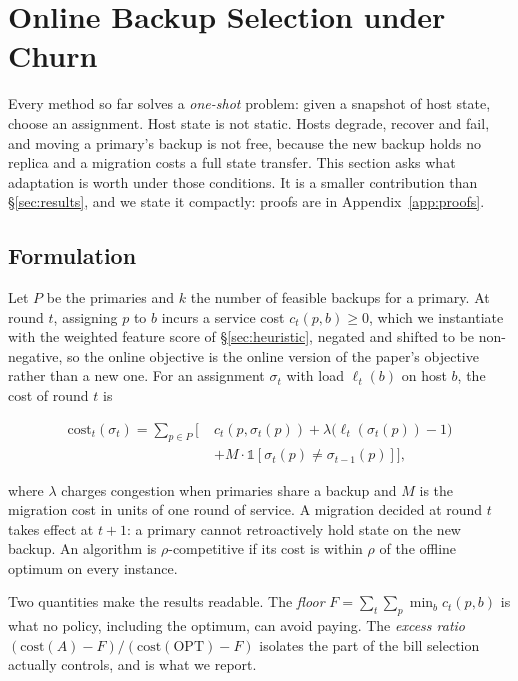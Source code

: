 \section{Online Backup Selection under Churn}
\label{sec:online}

Every method so far solves a \emph{one-shot} problem: given a snapshot of host
state, choose an assignment. Host state is not static. Hosts degrade, recover
and fail, and moving a primary's backup is not free, because the new backup
holds no replica and a migration costs a full state transfer. This section asks
what adaptation is worth under those conditions. It is a smaller contribution
than \S\ref{sec:results}, and we state it compactly: proofs are in
Appendix~\ref{app:proofs}.

\subsection{Formulation}
\label{sec:online:model}

Let $P$ be the primaries and $k$ the number of feasible backups for a primary.
At round $t$, assigning $p$ to $b$ incurs a service cost $c_t(p,b) \ge 0$, which
we instantiate with the weighted feature score of \S\ref{sec:heuristic}, negated
and shifted to be non-negative, so the online objective is the online version of
the paper's objective rather than a new one. For an assignment $\sigma_t$ with
load $\ell_t(b)$ on host $b$, the cost of round $t$ is

\begin{equation}
\begin{split}
\mathrm{cost}_t(\sigma_t) = \sum_{p \in P} \Big[\;
  & c_t(p, \sigma_t(p))
  + \lambda\big(\ell_t(\sigma_t(p)) - 1\big) \\
  & + M \cdot \mathbb{1}[\sigma_t(p) \neq \sigma_{t-1}(p)] \Big],
\end{split}
\label{eq:roundcost}
\end{equation}

where $\lambda$ charges congestion when primaries share a backup and $M$ is the
migration cost in units of one round of service. A migration decided at round
$t$ takes effect at $t+1$: a primary cannot retroactively hold state on the new
backup. An algorithm is $\rho$-competitive if its cost is within $\rho$ of the
offline optimum on every instance.

Two quantities make the results readable. The \emph{floor}
$F = \sum_t \sum_p \min_b c_t(p,b)$ is what no policy, including the optimum,
can avoid paying. The \emph{excess ratio}
$(\mathrm{cost}(A) - F)/(\mathrm{cost}(\mathrm{OPT}) - F)$ isolates the part of
the bill selection actually controls, and is what we report.

